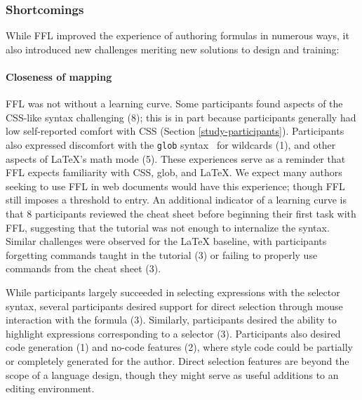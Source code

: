 

\subsubsection{Shortcomings}\label{sec:shortcomings} While FFL improved the experience of authoring formulas in numerous ways, it also introduced new challenges meriting new solutions to design and training:

\paragraph{Closeness of mapping}
FFL was not without a learning curve. Some participants found aspects of the CSS-like syntax challenging (8); this is in part because participants generally had low self-reported comfort with CSS (Section \ref{study-participants}). Participants also expressed discomfort with the \texttt{glob} syntax~\cite{UnixMan} for wildcards (1), and other aspects of LaTeX's math mode (5). These experiences serve as a reminder that FFL expects familiarity with CSS, glob, and LaTeX. We expect many authors seeking to use FFL in web documents would have this experience; though FFL still imposes a threshold to entry. An additional indicator of a learning curve is that 8 participants reviewed the cheat sheet before beginning their first task with FFL, suggesting that the tutorial was not enough to internalize the syntax. Similar challenges were observed for the LaTeX baseline, with participants forgetting commands taught in the tutorial (3) or failing to properly use commands from the cheat sheet (3).

While participants largely succeeded in selecting expressions with the selector syntax, several participants desired support for direct selection through mouse interaction with the formula (3). Similarly, participants desired the ability to highlight expressions corresponding to a selector (3). Participants also desired code generation (1) and no-code features (2), where style code could be partially or completely generated for the author. Direct selection features are beyond the scope of a language design, though they might serve as useful additions to an editing environment.


